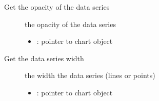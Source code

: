 \documentclass[letterpaper,10pt,english]{sphinxmanual}
\begin{document}

\begin{fulllineitems}
\label{\detokenize{object-types/chart:_CPPv423lv_chart_get_series_opaPK8lv_obj_t}}%
\pysigstartmultiline
{}\label{\detokenize{object-types/chart:lv__chart_8h_1a6c91d5fdb1f4503f3eb673c7e0db3bf8}}%
\pysigstopmultiline
Get the opacity of the data series \begin{description}
\item[{}] \leavevmode
the opacity of the data series 

\item[{}] \leavevmode\begin{itemize}
\item {} 
: pointer to chart object 

\end{itemize}

\end{description}


\end{fulllineitems}


\begin{fulllineitems}
\label{\detokenize{object-types/chart:_CPPv425lv_chart_get_series_widthPK8lv_obj_t}}%
\pysigstartmultiline
{}\label{\detokenize{object-types/chart:lv__chart_8h_1a8e33e781e526c97e2e5a35db1d78feea}}%
\pysigstopmultiline
Get the data series width \begin{description}
\item[{}] \leavevmode
the width the data series (lines or points) 

\item[{}] \leavevmode\begin{itemize}
\item {} 
: pointer to chart object 

\end{itemize}

\end{description}


\end{fulllineitems}
\end{document}
